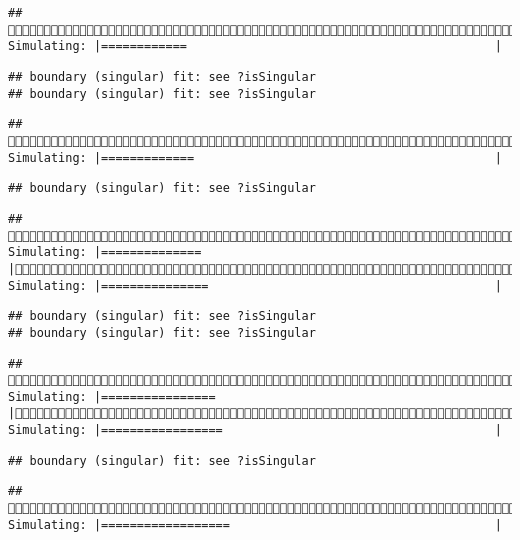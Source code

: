 \documentclass[]{article}
\begin{document}
\begin{verbatim}
## (1/4) Simulating: |============                                           |
\end{verbatim}

\begin{verbatim}
## boundary (singular) fit: see ?isSingular
## boundary (singular) fit: see ?isSingular
\end{verbatim}

\begin{verbatim}
## (1/4) Simulating: |=============                                          |
\end{verbatim}

\begin{verbatim}
## boundary (singular) fit: see ?isSingular
\end{verbatim}

\begin{verbatim}
## (1/4) Simulating: |==============                                         |(1/4) Simulating: |===============                                        |
\end{verbatim}

\begin{verbatim}
## boundary (singular) fit: see ?isSingular
## boundary (singular) fit: see ?isSingular
\end{verbatim}

\begin{verbatim}
## (1/4) Simulating: |================                                       |(1/4) Simulating: |=================                                      |
\end{verbatim}

\begin{verbatim}
## boundary (singular) fit: see ?isSingular
\end{verbatim}

\begin{verbatim}
## (1/4) Simulating: |==================                                     |
\end{verbatim}
\end{document}
